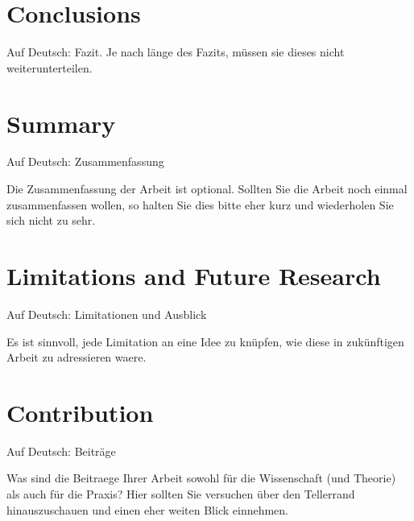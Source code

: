 \section{Conclusions}\label{chap:conclusions}

Auf Deutsch: Fazit. Je nach länge des Fazits, müssen sie dieses nicht weiterunterteilen.

\section{Summary}

Auf Deutsch: Zusammenfassung 

Die Zusammenfassung der Arbeit ist optional. Sollten Sie die Arbeit noch einmal zusammenfassen wollen, so halten Sie dies bitte eher kurz und wiederholen Sie sich nicht zu sehr.

\section{Limitations and Future Research}

Auf Deutsch: Limitationen und Ausblick

Es ist sinnvoll, jede Limitation an eine Idee zu knüpfen, wie diese in zukünftigen Arbeit zu adressieren waere.

\section{Contribution}

Auf Deutsch: Beiträge

Was sind die Beitraege Ihrer Arbeit sowohl für die Wissenschaft (und Theorie) als auch für die Praxis? Hier sollten Sie versuchen über den Tellerrand hinauszuschauen und einen eher weiten Blick einnehmen.




